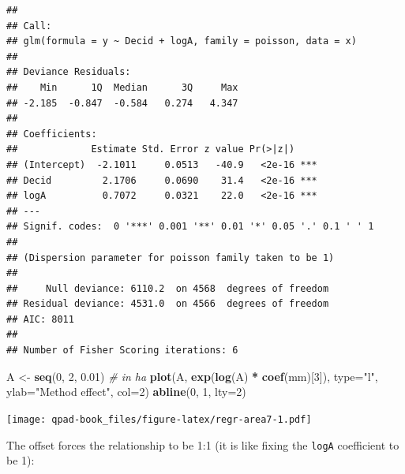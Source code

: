 \documentclass[12pt,]{book}
\newenvironment{Shaded}{\begin{snugshade}}{\end{snugshade}}
\newcommand{\CommentTok}[1]{\textcolor[rgb]{0.56,0.35,0.01}{\textit{#1}}}
\newcommand{\DataTypeTok}[1]{\textcolor[rgb]{0.13,0.29,0.53}{#1}}
\newcommand{\DecValTok}[1]{\textcolor[rgb]{0.00,0.00,0.81}{#1}}
\newcommand{\FloatTok}[1]{\textcolor[rgb]{0.00,0.00,0.81}{#1}}
\newcommand{\KeywordTok}[1]{\textcolor[rgb]{0.13,0.29,0.53}{\textbf{#1}}}
\newcommand{\NormalTok}[1]{#1}
\newcommand{\OperatorTok}[1]{\textcolor[rgb]{0.81,0.36,0.00}{\textbf{#1}}}
\newcommand{\StringTok}[1]{\textcolor[rgb]{0.31,0.60,0.02}{#1}}
\begin{document}
\begin{verbatim}
## 
## Call:
## glm(formula = y ~ Decid + logA, family = poisson, data = x)
## 
## Deviance Residuals: 
##    Min      1Q  Median      3Q     Max  
## -2.185  -0.847  -0.584   0.274   4.347  
## 
## Coefficients:
##             Estimate Std. Error z value Pr(>|z|)    
## (Intercept)  -2.1011     0.0513   -40.9   <2e-16 ***
## Decid         2.1706     0.0690    31.4   <2e-16 ***
## logA          0.7072     0.0321    22.0   <2e-16 ***
## ---
## Signif. codes:  0 '***' 0.001 '**' 0.01 '*' 0.05 '.' 0.1 ' ' 1
## 
## (Dispersion parameter for poisson family taken to be 1)
## 
##     Null deviance: 6110.2  on 4568  degrees of freedom
## Residual deviance: 4531.0  on 4566  degrees of freedom
## AIC: 8011
## 
## Number of Fisher Scoring iterations: 6
\end{verbatim}

\begin{Shaded}
\begin{Highlighting}[]
\NormalTok{A <-}\StringTok{ }\KeywordTok{seq}\NormalTok{(}\DecValTok{0}\NormalTok{, }\DecValTok{2}\NormalTok{, }\FloatTok{0.01}\NormalTok{) }\CommentTok{# in ha}
\KeywordTok{plot}\NormalTok{(A, }\KeywordTok{exp}\NormalTok{(}\KeywordTok{log}\NormalTok{(A) }\OperatorTok{*}\StringTok{ }\KeywordTok{coef}\NormalTok{(mm)[}\DecValTok{3}\NormalTok{]), }\DataTypeTok{type=}\StringTok{"l"}\NormalTok{,}
  \DataTypeTok{ylab=}\StringTok{"Method effect"}\NormalTok{, }\DataTypeTok{col=}\DecValTok{2}\NormalTok{)}
\KeywordTok{abline}\NormalTok{(}\DecValTok{0}\NormalTok{, }\DecValTok{1}\NormalTok{, }\DataTypeTok{lty=}\DecValTok{2}\NormalTok{)}
\end{Highlighting}
\end{Shaded}

\texttt{[image: qpad-book\_files/figure-latex/regr-area7-1.pdf]}

The offset forces the relationship to be 1:1
(it is like fixing the \texttt{logA} coefficient to be 1):

\begin{Shaded}
\end{Shaded}
\end{document}
